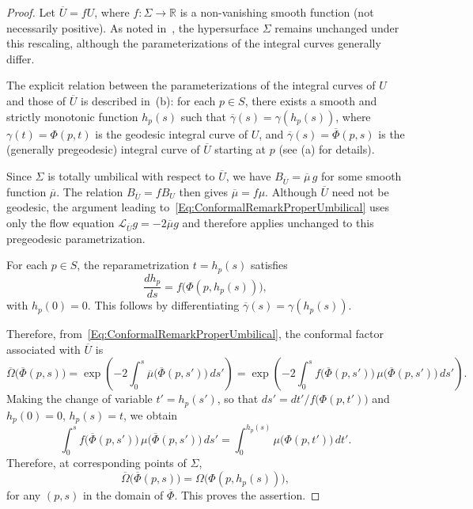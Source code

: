 \documentclass[11pt]{article}
\numberwithin{equation}{section}
\begin{document}
	
\begin{proof}
	Let $\overline{U} = f U$, where $f \colon \Sigma \to \mathbb{R}$ is a non-vanishing smooth function (not necessarily positive). As noted in~, the hypersurface $\Sigma$ remains unchanged under this rescaling, although the parameterizations of the integral curves generally differ. 
	
	The explicit relation between the parameterizations of the integral curves of $U$ and those of $\overline{U}$ is described in~(b): for each $p \in S$, there exists a smooth and strictly monotonic function $h_p(s)$ such that $\overline{\gamma}(s) = \gamma(h_p(s))$, where $\gamma(t) = \Phi(p, t)$ is the geodesic integral curve of $U$, and $\overline{\gamma}(s) = \overline{\Phi}(p, s)$ is the (generally pregeodesic) integral curve of $\overline{U}$ starting at $p$ (see (a) for details).
	
	Since $\Sigma$ is totally umbilical with respect to $\overline{U}$, we have $B_{\overline{U}} = \overline{\mu}\, g$ for some smooth function $\overline{\mu}$. The relation $B_{\overline{U}} = f B_U$ then gives $\overline{\mu} = f \mu$.
	Although $\overline U$ need not be geodesic, the argument leading to~\eqref{Eq:ConformalRemarkProperUmbilical} uses only the flow equation $\mathscr L_{\overline U}g=-2\overline\mu g$ and therefore applies unchanged to this pregeodesic parametrization.
	
	For each $p \in S$, the reparametrization $t = h_p(s)$ satisfies
	\[
	\frac{dh_p}{ds} = f\bigl(\Phi(p, h_p(s))\bigr),
	\]
	with $h_p(0) = 0$. This follows by differentiating $\overline{\gamma}(s) = \gamma(h_p(s))$.
	
	Therefore, from~\eqref{Eq:ConformalRemarkProperUmbilical}, the conformal factor associated with $\overline{U}$ is
	\[
	\overline{\Omega}\bigl(\overline{\Phi}(p, s)\bigr) = \exp\left(-2 \int_0^s \overline{\mu}\bigl(\overline{\Phi}(p, s')\bigr)\, ds'\right)
	= \exp\left(-2 \int_0^s f\bigl(\overline{\Phi}(p, s')\bigr)\, \mu\bigl(\overline{\Phi}(p, s')\bigr)\, ds'\right).
	\]
	Making the change of variable $t' = h_p(s')$, so that $ds' = dt'/f\bigl(\Phi(p, t')\bigr)$ and $h_p(0) = 0$, $h_p(s) = t$, we obtain
	\[
	\int_0^s f\bigl(\overline{\Phi}(p, s')\bigr)\, \mu\bigl(\overline{\Phi}(p, s')\bigr)\, ds' = \int_0^{h_p(s)} \mu\bigl(\Phi(p, t')\bigr)\, dt'.
	\]
	Therefore, at corresponding points of $\Sigma$,
	\[
	\overline{\Omega}\bigl(\overline{\Phi}(p, s)\bigr) = \Omega\bigl(\Phi(p, h_p(s))\bigr),
	\]
	for any $(p, s)$ in the domain of $\overline{\Phi}$. This proves the assertion.
\end{proof}
\end{document}
